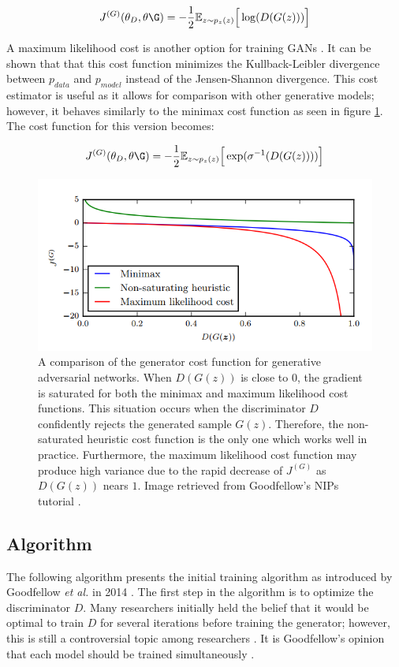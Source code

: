 \documentclass[11pt]{article}
\begin{document}
$$J^{(G)}(\theta_D,\theta\G) = -\frac{1}{2}\mathbb{E}_{z\sim p_{z}(z)}\Big[\log(D(G(z)))\Big]$$

A maximum likelihood cost is another option for training GANs \citep{2017arXiv170100160G}. It can be shown that that this cost function minimizes the Kullback-Leibler divergence between $p_{data}$ and $p_{model}$ instead of the Jensen-Shannon divergence. This cost estimator is useful as it allows for comparison with other generative models; however, it behaves similarly to the minimax cost function as seen in figure \ref{fig:CostFunc}. The cost function for this version becomes:

$$J^{(G)}(\theta_D,\theta\G) = -\frac{1}{2}\mathbb{E}_{z\sim p_{z}(z)}\Big[\exp(\sigma^{-1}(D(G(z))))\Big]$$

\begin{figure}
\centering
\includegraphics[scale=0.5]{costfunc}
\caption{A comparison of the generator cost function for generative adversarial networks. When $D(G(z))$ is close to $0$, the gradient is saturated for both the minimax and maximum likelihood cost functions. This situation occurs when the discriminator $D$ confidently rejects the generated sample $G(z)$. Therefore, the non-saturated heuristic cost function is the only one which works well in practice. Furthermore, the maximum likelihood cost function may produce high variance due to the rapid decrease of $J^{(G)}$ as $D(G(z))$ nears $1$. Image retrieved from Goodfellow's NIPs tutorial \citep{2017arXiv170100160G}.}
\label{fig:CostFunc}
\end{figure}

\subsection{Algorithm}
The following algorithm presents the initial training algorithm as introduced by Goodfellow \textit{et al.} in 2014 \citep{2014arXiv1406.2661G}. The first step in the algorithm is to optimize the discriminator $D$. Many researchers initially held the belief that it would be optimal to train $D$ for several iterations before training the generator; however, this is still a controversial topic among researchers \citep{2017arXiv170100160G}. It is Goodfellow's opinion that each model should be trained simultaneously \citep{2017arXiv170100160G}.
\end{document}
